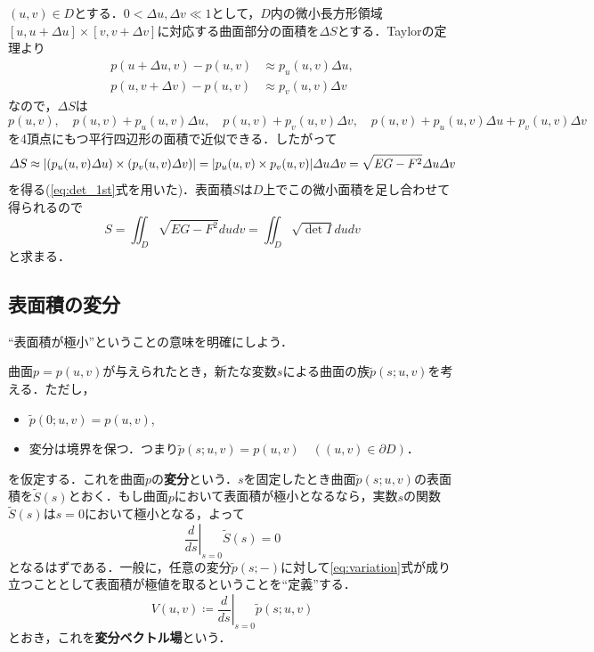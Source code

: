 \documentclass[a4j]{ltjsarticle}
\numberwithin{equation}{section}
\theoremstyle{definition}
\begin{document}
$(u,v)\in D$とする．$0<\varDelta u,\varDelta v\ll 1$として，$D$内の微小長方形領域$[u,u+\varDelta u]\times [v,v+\varDelta v]$に対応する曲面部分の面積を$\varDelta S$とする．Taylorの定理より
\begin{align}
    p(u+\varDelta u,v)-p(u,v)&\approx p_u(u,v)\varDelta u,\\
    p(u,v+\varDelta v)-p(u,v)&\approx p_v(u,v)\varDelta v
\end{align}
なので，$\varDelta S$は
\begin{equation}
    p(u,v),\quad p(u,v)+p_u(u,v)\varDelta u,\quad p(u,v)+p_v(u,v)\varDelta v,\quad p(u,v)+p_u(u,v)\varDelta u+p_v(u,v)\varDelta v
\end{equation}
を4頂点にもつ平行四辺形の面積で近似できる．したがって 
\begin{equation}
    \varDelta S\approx \abs{(p_u(u,v)\varDelta u)\times (p_v(u,v)\varDelta v)}=\abs{p_u(u,v)\times p_v(u,v)}\varDelta u\varDelta v=\sqrt{EG-F^2}\varDelta u\varDelta v
\end{equation}
を得る(\eqref{eq:det_1st}式を用いた)．表面積$S$は$D$上でこの微小面積を足し合わせて得られるので
\begin{equation}
    S=\iint_{D}\sqrt{EG-F^2}dudv=\iint_{D}\sqrt{\det I}dudv
\end{equation}
と求まる．
\subsection{表面積の変分}
``表面積が極小''ということの意味を明確にしよう．

曲面$p=p(u,v)$が与えられたとき，新たな変数$s$による曲面の族$\widetilde{p}(s;u,v)$を考える．ただし，
\begin{itemize}
    \item $\widetilde{p}(0;u,v)=p(u,v)$,
    \item 変分は境界を保つ．つまり$\widetilde{p}(s;u,v)=p(u,v)\quad ((u,v)\in \partial D)$．
\end{itemize}
を仮定する．これを曲面$p$の\textbf{変分}という．$s$を固定したとき曲面$\widetilde{p}(s;u,v)$の表面積を$\widetilde{S}(s)$とおく．もし曲面$p$において表面積が極小となるなら，実数$s$の関数$\widetilde{S}(s)$は$s=0$において極小となる，よって 
\begin{equation}
    \left.\frac{d}{ds}\right|_{s=0}\widetilde{S}(s)=0\label{eq:variation}
\end{equation}
となるはずである．一般に，任意の変分$\widetilde{p}(s;-)$に対して\eqref{eq:variation}式が成り立つこととして表面積が極値を取るということを``定義''する．
\begin{equation}
    V(u,v)\coloneq \left.\frac{d}{ds}\right|_{s=0}\widetilde{p}(s;u,v)
\end{equation}
とおき，これを\textbf{変分ベクトル場}という．
\end{document}
